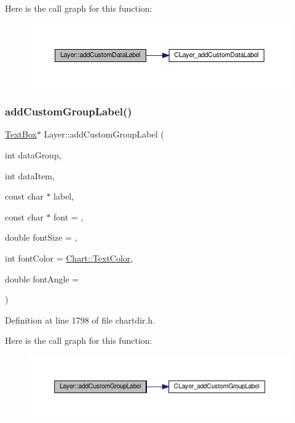 Here is the call graph for this function\+:
\nopagebreak
\begin{figure}[H]
\begin{center}
\leavevmode
\includegraphics[width=350pt]{class_layer_a8daa0b0f20efaca09d39862f1d2907d3_cgraph}
\end{center}
\end{figure}
\mbox{\label{class_layer_a1180f9510bf8f0495f9cc02410c31945}} 
\subsubsection{\texorpdfstring{add\+Custom\+Group\+Label()}{addCustomGroupLabel()}}
{\footnotesize\ttfamily \hyperlink{class_text_box}{Text\+Box}$\ast$ Layer\+::add\+Custom\+Group\+Label (\begin{DoxyParamCaption}\item[{int}]{data\+Group,  }\item[{int}]{data\+Item,  }\item[{const char $\ast$}]{label,  }\item[{const char $\ast$}]{font = {},  }\item[{double}]{font\+Size = {},  }\item[{int}]{font\+Color = {\ttfamily \hyperlink{namespace_chart_abee0d882fdc9ad0b001245ad9fc64011a879e14f2f5024caccc047374342321ef}{Chart\+::\+Text\+Color}},  }\item[{double}]{font\+Angle = {} }\end{DoxyParamCaption})\hspace{0.3cm}{\ttfamily [inline]}}



Definition at line 1798 of file chartdir.\+h.

Here is the call graph for this function\+:
\nopagebreak
\begin{figure}[H]
\begin{center}
\leavevmode
\includegraphics[width=350pt]{class_layer_a1180f9510bf8f0495f9cc02410c31945_cgraph}
\end{center}
\end{figure}
\mbox{\label{class_layer_af14282bdf56c0987e2bd1510fb83a9b4}} 

